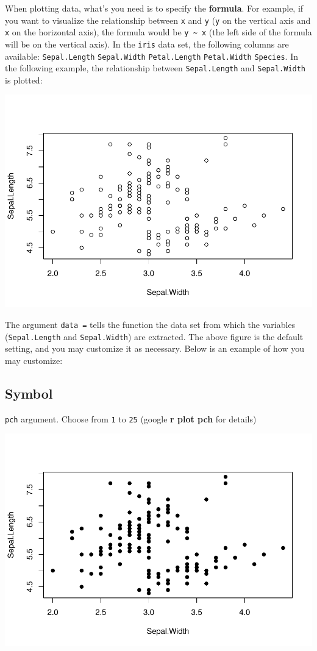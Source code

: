 \documentclass[
]{book}
\begin{document}
When plotting data, what's you need is to specify the \textbf{formula}. For example, if you want to visualize the relationship between \texttt{x} and \texttt{y} (\texttt{y} on the vertical axis and \texttt{x} on the horizontal axis), the formula would be \texttt{y\ \textasciitilde{}\ x} (the left side of the formula will be on the vertical axis). In the \texttt{iris} data set, the following columns are available: \texttt{Sepal.Length} \texttt{Sepal.Width} \texttt{Petal.Length} \texttt{Petal.Width} \texttt{Species}. In the following example, the relationship between \texttt{Sepal.Length} and \texttt{Sepal.Width} is plotted:

\includegraphics{_main_files/figure-latex/unnamed-chunk-23-1.pdf}

The argument \texttt{data\ =} tells the function the data set from which the variables (\texttt{Sepal.Length} and \texttt{Sepal.Width}) are extracted. The above figure is the default setting, and you may customize it as necessary. Below is an example of how you may customize:

\hypertarget{symbol}{%
\subsection{Symbol}\label{symbol}}

\texttt{pch} argument. Choose from \texttt{1} to \texttt{25} (google \textbf{r plot pch} for details)

\includegraphics{_main_files/figure-latex/unnamed-chunk-24-1.pdf}
\end{document}
